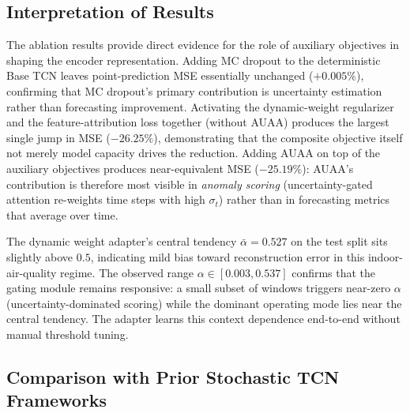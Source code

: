 
\subsection{Interpretation of Results}

The ablation results provide direct evidence for the role of auxiliary objectives in shaping the encoder representation. Adding MC dropout to the deterministic Base TCN leaves point-prediction MSE essentially unchanged ($+0.005\%$), confirming that MC dropout's primary contribution is uncertainty estimation rather than forecasting improvement. Activating the dynamic-weight regularizer and the feature-attribution loss together (without AUAA) produces the largest single jump in MSE ($-26.25\%$), demonstrating that the composite objective itself not merely model capacity drives the reduction. Adding AUAA on top of the auxiliary objectives produces near-equivalent MSE ($-25.19\%$): AUAA's contribution is therefore most visible in \emph{anomaly scoring} (uncertainty-gated attention re-weights time steps with high $\sigma_t$) rather than in forecasting metrics that average over time.

The dynamic weight adapter's central tendency $\bar{\alpha} = 0.527$ on the test split sits slightly above $0.5$, indicating mild bias toward reconstruction error in this indoor-air-quality regime. The observed range $\alpha \in [0.003, 0.537]$ confirms that the gating module remains responsive: a small subset of windows triggers near-zero $\alpha$ (uncertainty-dominated scoring) while the dominant operating mode lies near the central tendency. The adapter learns this context dependence end-to-end without manual threshold tuning.

\subsection{Comparison with Prior Stochastic TCN Frameworks}

